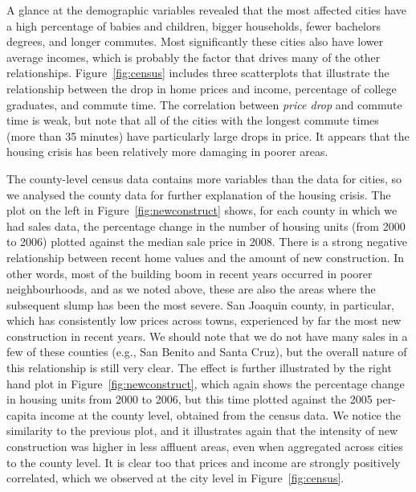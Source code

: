 \documentclass[oneside]{article}
\begin{document}
A glance at the demographic variables revealed that the most affected cities have a high percentage of babies and children, bigger households, fewer bachelors degrees, and longer commutes.  Most significantly these cities also have lower average incomes, which is probably the factor that drives many of the other relationships. Figure~\ref{fig:census} includes three scatterplots that illustrate the relationship between the drop in home prices and income, percentage of college graduates, and commute time.  The correlation between {\em price drop} and commute time is weak, but note that all of the cities with the longest commute times (more than 35 minutes) have particularly large drops in price. It appears that the housing crisis has been relatively more damaging in poorer areas.

The county-level census data contains more variables than the data for cities, so we analysed the county data for further explanation of the housing crisis. The plot on the left in Figure~\ref{fig:newconstruct} shows, for each county in which we had sales data, the percentage change in the number of housing units (from 2000 to 2006) plotted against the median sale price in 2008. There is a strong negative relationship between recent home values and the amount of new construction. In other words, most of the building boom in recent years occurred in poorer neighbourhoods, and as we noted above, these are also the areas where the subsequent slump has been the most severe. San Joaquin county, in particular, which has consistently low prices across towns, experienced by far the most new construction in recent years.  We should note that we do not have many sales in a few of these counties (e.g., San Benito and Santa Cruz), but the overall nature of this relationship is still very clear.  The effect is further illustrated by the right hand plot in Figure~\ref{fig:newconstruct}, which again shows the percentage change in housing units from 2000 to 2006, but this time plotted against the 2005 per-capita income at the county level, obtained from the census data. We notice the similarity to the previous plot, and it illustrates again that the intensity of new construction was higher in less affluent areas, even when aggregated across cities to the county level. It is clear too that prices and income are strongly positively correlated, which we observed at the city level in Figure~\ref{fig:census}.

\end{document}

